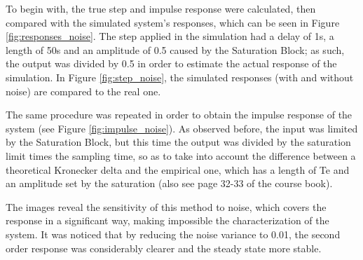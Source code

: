 \documentclass[a4paper,11pt]{article}
\begin{document}
To begin with, the true step and impulse response were calculated, then compared with the simulated system's responses, which can be seen in Figure \ref{fig:responses_noise}. The step applied in the simulation had a delay of 1s, a length of 50s and an amplitude of 0.5 caused by the Saturation Block; as such, the output was divided by 0.5 in order to estimate the actual response of the simulation. In Figure \ref{fig:step_noise}, the simulated responses (with and without noise) are compared to the real one. 

The same procedure was repeated in order to obtain the impulse response of the system (see Figure \ref{fig:impulse_noise}). As observed before, the input was limited by the Saturation Block, but this time the output was divided by the saturation limit times the sampling time, so as to take into account the difference between a theoretical Kronecker delta and the empirical one, which has a length of Te and an amplitude set by the saturation (also see page 32-33 of the course book).

The images reveal the sensitivity of this method to noise, which covers the response in a significant way, making impossible the characterization of the system. It was noticed that by reducing the noise variance to 0.01, the second order response was considerably clearer and the steady state more stable.
\end{document}
